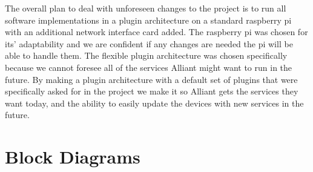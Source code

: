 The overall plan to deal with unforeseen changes to the project is to run all software implementations in a plugin architecture on a standard raspberry pi with an additional network interface card added.  The raspberry pi was chosen for its' adaptability and we are confident if any changes are needed the pi will be able to handle them.  The flexible plugin architecture was chosen specifically because we cannot foresee all of the services Alliant might want to run in the future.  By making a plugin architecture with a default set of plugins that were specifically asked for in the project we make it so Alliant gets the services they want today, and the ability to easily update the devices with new services in the future.

\section{Block Diagrams}

\begin{figure}[h]
\centering
{

}
\end{figure}
